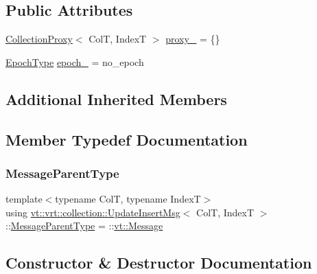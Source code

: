 \subsection*{Public Attributes}
\begin{DoxyCompactItemize}
\item 
\hyperlink{structvt_1_1vrt_1_1collection_1_1_collection_proxy}{Collection\+Proxy}$<$ ColT, IndexT $>$ \hyperlink{structvt_1_1vrt_1_1collection_1_1_update_insert_msg_ae24b0b8a8147f78cb6275b97ddb3d6a0}{proxy\+\_\+} = \{\}
\item 
\hyperlink{namespacevt_a985a5adf291c34a3ca263b3378388236}{Epoch\+Type} \hyperlink{structvt_1_1vrt_1_1collection_1_1_update_insert_msg_a6639021b34fd80c4c17a65b7fe9034f6}{epoch\+\_\+} = no\+\_\+epoch
\end{DoxyCompactItemize}
\subsection*{Additional Inherited Members}


\subsection{Member Typedef Documentation}
\mbox{\label{structvt_1_1vrt_1_1collection_1_1_update_insert_msg_a974021fa221366babeddb02831c8e89e}} 
\subsubsection{\texorpdfstring{Message\+Parent\+Type}{MessageParentType}}
{\footnotesize\ttfamily template$<$typename ColT, typename IndexT$>$ \\
using \hyperlink{structvt_1_1vrt_1_1collection_1_1_update_insert_msg}{vt\+::vrt\+::collection\+::\+Update\+Insert\+Msg}$<$ ColT, IndexT $>$\+::\hyperlink{structvt_1_1messaging_1_1_active_msg_ac2e6d93267991027ce78c968b17064c7}{Message\+Parent\+Type} =  \+::\hyperlink{namespacevt_a3a3ddfef40b4c90915fa43cdd5f129ea}{vt\+::\+Message}}



\subsection{Constructor \& Destructor Documentation}
\mbox{\label{structvt_1_1vrt_1_1collection_1_1_update_insert_msg_aae10dc2f0e158e40397336160f5dad64}} 
